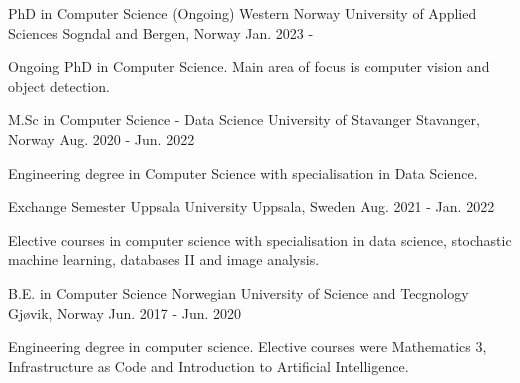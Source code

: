 

\begin{cventries}

  \cventry
    {PhD in Computer Science (Ongoing)} %
    {Western Norway University of Applied Sciences} %
    {Sogndal and Bergen, Norway} %
    {Jan. 2023 -} %
    {
      \begin{cvitems} %
        \item {Ongoing PhD in Computer Science. Main area of focus is computer vision and object detection.}
      \end{cvitems}
    }

  \cventry
    {M.Sc in Computer Science - Data Science} %
    {University of Stavanger} %
    {Stavanger, Norway} %
    {Aug. 2020 - Jun. 2022} %
    {
      \begin{cvitems} %
        \item {Engineering degree in Computer Science with specialisation in Data Science.}
      \end{cvitems}
    }

  \cventry
    {Exchange Semester} %
    {Uppsala University} %
    {Uppsala, Sweden} %
    {Aug. 2021 - Jan. 2022} %
    {
      \begin{cvitems} %
        \item {Elective courses in computer science with specialisation in data science, stochastic machine learning, databases II and image analysis.}
      \end{cvitems}
    }


  \cventry
    {B.E. in Computer Science} %
    {Norwegian University of Science and Tecgnology} %
    {Gjøvik, Norway} %
    {Jun. 2017 - Jun. 2020} %
    {
      \begin{cvitems} %
        \item {Engineering degree in computer science. Elective courses were Mathematics 3, Infrastructure as Code and Introduction to Artificial Intelligence.}
      \end{cvitems}
    }


\end{cventries}
